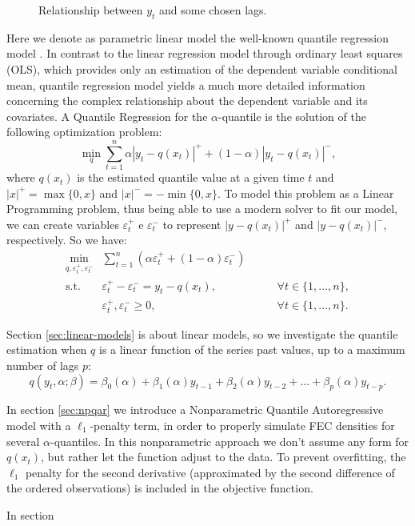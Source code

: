 \begin{figure}
\begin{minipage}[t]{0.45\linewidth}
\begin{minipage}[b]{\linewidth}
    \end{minipage}
  \end{minipage}
  \caption{Relationship between $y_t$ and some chosen lags.}
  \label{lags-icaraizinho}
\end{figure}

Here we denote as parametric linear model the well-known quantile regression model \cite{koenker2005quantile}. In contrast to the linear regression model through ordinary least squares (OLS), which provides only an estimation of the dependent variable conditional mean, quantile regression model yields a much more detailed information concerning the complex relationship about the dependent variable and its covariates. A Quantile Regression for the $\alpha$-quantile is the solution of the following optimization problem:
\begin{equation}
\min_{q}\sum_{t=1}^{n}\alpha|y_{t}-q(x_t)|^{+}+(1-\alpha)|y_{t}-q(x_t)|^{-},
\label{eq:linear-model}
\end{equation}
where $q(x_t)$ is the estimated quantile value at a given time $t$ and $|x|^+=\max\{0,x\}$ and $|x|^-=-\min\{0,x\}$. To model this problem as a Linear Programming problem, thus being able to use a modern solver to fit our model,  we can create variables $\varepsilon^+_t$ e $\varepsilon^-_t$ to represent $|y-q(x_t)|^+$ and $|y-q(x_t)|^-$, respectively. So we have:
\begin{equation}
\begin{aligned}\min_{q,\varepsilon_{t}^{+}, \varepsilon_{t}^{-}} & \sum_{t=1}^{n}\left(\alpha \varepsilon_{t}^{+}+(1-\alpha)\varepsilon_{t}^{-}\right) & \\
\mbox{s.t. } & \varepsilon_{t}^{+}-\varepsilon_{t}^{-}=y_{t}-q(x_{t}), & \qquad\forall t \in \{1,\dots,n\},\\
& \varepsilon_t^+,\varepsilon_t^- \geq 0, & \qquad \forall t \in \{1,\dots,n\}.
\end{aligned}
\label{eq:qar-general}
\end{equation}

Section \ref{sec:linear-models} is about linear models, so we investigate the quantile estimation when $q$ is a linear function of the series past values, up to a maximum number of lags $p$:
\begin{equation}
	q(y_t, \alpha; \beta) = \beta_0(\alpha) + \beta_1(\alpha)y_{t-1} + \beta_2(\alpha)y_{t-2} + \dots + \beta_p(\alpha) y_{t-p}.
	\label{eq:ft-qar}
\end{equation}

In section \ref{sec:npqar} we introduce a Nonparametric Quantile Autoregressive model with a $\ell_{1}$-penalty term, in order to properly simulate FEC densities for several $\alpha$-quantiles. In this nonparametric approach we don't assume any form for $q(x_t)$, but rather let the function adjust to the data. To prevent overfitting, the $\ell_1$ penalty for the second derivative (approximated by the second difference of the ordered observations) is included in the objective function.

In section 